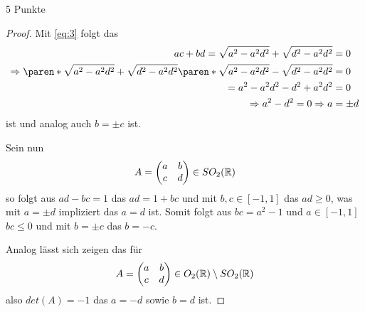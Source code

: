 \documentclass{problemset}
\begin{document}
\begin{problem}{5 Punkte}
\begin{proof}
    Mit \eqref{eq:3} folgt das
    \begin{align*}
        ac + bd  = \sqrt{a^2 - a^2 d^2} + \sqrt{d^2 - a^2 d^2}                                                               & = 0     \\
        \Rightarrow \paren*{\sqrt{a^2 - a^2 d^2} + \sqrt{d^2 - a^2 d^2}}\paren*{\sqrt{a^2 - a^2 d^2} - \sqrt{d^2 - a^2 d^2}} & = 0     \\
        = a^2 - a^2 d^2 - d^2 + a^2 d^2                                                                                      & = 0     \\
        \Rightarrow a^2 - d^2  = 0 \Rightarrow a                                                                             & = \pm d
    \end{align*}
    ist und analog auch \(b = \pm c\) ist.

    Sein nun \[A = \begin{pmatrix} a & b \\ c & d \end{pmatrix} \in SO_2(\mathbb{R})\]
    so folgt aus \(ad - bc = 1\) das \(ad = 1 + bc\) und mit \(b, c \in [-1,1]\)
    das \(ad \ge 0\), was mit \(a = \pm d\) impliziert das \(a = d\) ist. Somit
    folgt aus \(bc = a^2 - 1\) und \(a \in [-1,1]\) \(bc \le 0\) und mit \(b = \pm
    c\) das \( b = - c\).

    Analog lässt sich zeigen das für \[
        A = \begin{pmatrix} a & b \\ c & d \end{pmatrix} \in O_2(\mathbb{R}) \setminus SO_2(\mathbb{R})
    \] also \(det(A) = -1\) das \(a = -d\) sowie \(b = d\) ist.
\end{proof}
\end{problem}
\end{document}
